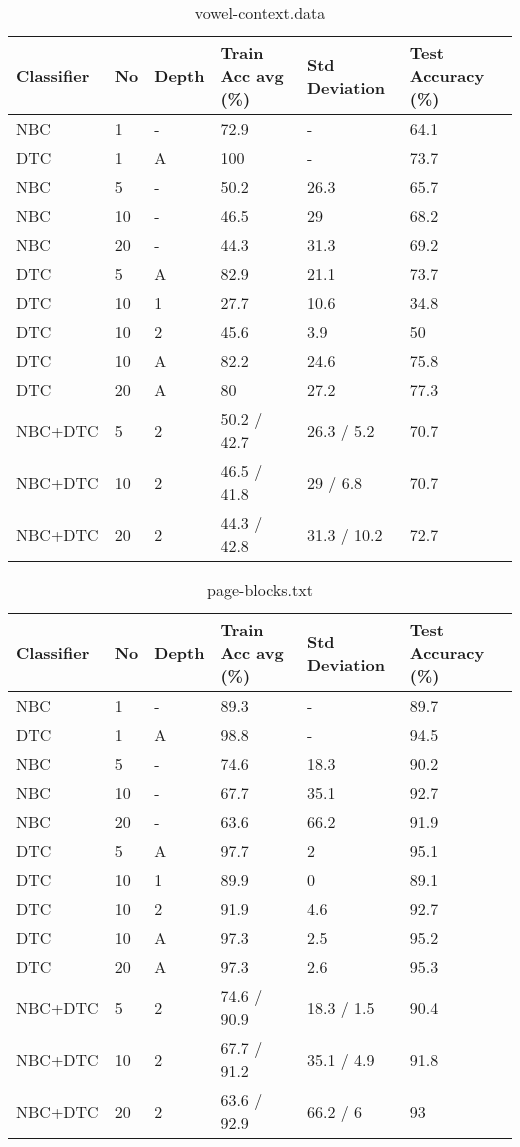 \begin{table}[h]
	\centering
	\begin{tabular}[h]{l|l|l|l|l|l}
		Classifier & No & Depth & Train Acc avg (\%) & Std Deviation & Test Accuracy (\%)\\
		\hline
		NBC & 1 & -  & 72.9 & - & 64.1 \\
		DTC & 1 & A  & 100 & - & 73.7 \\
		NBC & 5 & -  & 50.2 & 26.3 & 65.7 \\
		NBC & 10 & -  & 46.5 & 29 & 68.2 \\
		NBC & 20 &  - & 44.3 & 31.3 & 69.2 \\
		DTC & 5 & A  & 82.9 & 21.1 & 73.7 \\
		DTC & 10 & 1  & 27.7 & 10.6 & 34.8 \\
		DTC & 10 & 2  & 45.6 & 3.9 & 50 \\
		DTC & 10 & A  & 82.2 & 24.6 & 75.8 \\
		DTC & 20 & A  & 80 & 27.2 & 77.3 \\
		NBC+DTC & 5 & 2  & 50.2 / 42.7 & 26.3 / 5.2 & 70.7 \\
		NBC+DTC & 10 & 2  & 46.5 / 41.8 & 29 / 6.8 & 70.7 \\
		NBC+DTC & 20 & 2  & 44.3 / 42.8 & 31.3 / 10.2 & 72.7 \\
	\end{tabular}
	\caption{vowel-context.data}
	\label{tab:vowel-context}
\end{table}

\begin{table}[h]
	\centering
	\begin{tabular}[h]{l|l|l|l|l|l}
		Classifier & No & Depth & Train Acc avg (\%) & Std Deviation & Test Accuracy (\%)\\
		\hline
		NBC & 1 & -  & 89.3 & - & 89.7 \\
		DTC & 1 & A  & 98.8 & - & 94.5 \\
		NBC & 5 & -  & 74.6 & 18.3 & 90.2 \\
		NBC & 10 & -  & 67.7 & 35.1 & 92.7 \\
		NBC & 20 & -  & 63.6 & 66.2 & 91.9 \\
		DTC & 5 & A  & 97.7 & 2 & 95.1 \\
		DTC & 10 & 1  & 89.9 & 0 & 89.1 \\
		DTC & 10 & 2  & 91.9 & 4.6 & 92.7 \\
		DTC & 10 & A  & 97.3 & 2.5 & 95.2 \\
		DTC & 20 & A  & 97.3 & 2.6 & 95.3 \\
		NBC+DTC & 5 & 2  & 74.6 / 90.9 & 18.3 / 1.5 & 90.4 \\
		NBC+DTC & 10 & 2  & 67.7 / 91.2 & 35.1 / 4.9 & 91.8 \\
		NBC+DTC & 20 & 2  & 63.6 / 92.9 & 66.2 / 6 & 93 \\
	\end{tabular}
	\caption{page-blocks.txt}
\end{table}

